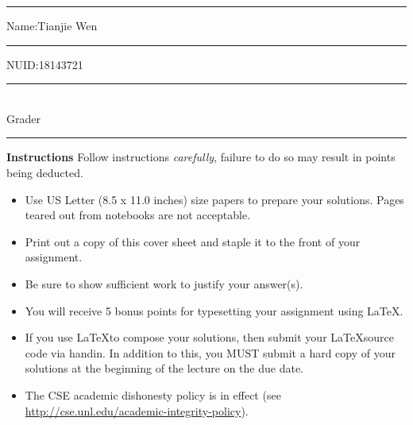 \documentclass[10pt]{exam}
\begin{document}
\hrule

\vspace{.50cm} Name:Tianjie Wen \rule{2in}{.001in} \hfill NUID:18143721
\vspace{.50cm} \rule{2in}{.001in} \hfill 
\\ Grader \rule{2in}{.001in}

\textbf{Instructions} Follow instructions \emph{carefully}, failure to do so may result in points being deducted.  
\begin{itemize}

  \item Use US Letter (8.5 x 11.0 inches) size papers to prepare your solutions. Pages teared out from notebooks are not acceptable.
  \item Print out a copy of this cover sheet and staple it to the front of your assignment.  
  \item Be sure to show sufficient work to justify your answer(s).
  \item You will receive 5 bonus points for typesetting your assignment using \LaTeX.  
  \item If you use \LaTeX to compose your solutions, then submit your \LaTeX source code via handin. In addition to this, you MUST submit a hard copy of your solutions at the beginning of the lecture on the due date.
  \item The CSE academic dishonesty policy is in effect (see \url{http://cse.unl.edu/academic-integrity-policy}).   

\end{itemize}


  
   


\begin{center}
{\small \gradetable[v] }
\end{center}

\newpage
\end{document}
